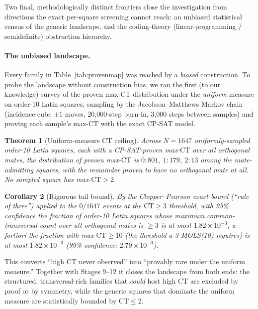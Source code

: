 \documentclass[11pt,a4paper]{article}
\newtheorem{theorem}{Theorem}[section]
\newtheorem{corollary}[theorem]{Corollary}
\theoremstyle{remark}
\newcommand{\CT}{\mathrm{CT}}
\begin{document}
Two final, methodologically distinct frontiers close the investigation
from directions the exact per-square screening cannot reach: an unbiased
statistical census of the generic landscape, and the coding-theory
(linear-programming / semidefinite) obstruction hierarchy.

\paragraph{The unbiased landscape.}
Every family in Table~\ref{tab:provenmap} was reached by a \emph{biased}
construction. To probe the landscape without construction bias, we ran the
first (to our knowledge) survey of the proven max-$\CT$ distribution under
the \emph{uniform} measure on order-10 Latin squares, sampling by the
Jacobson--Matthews Markov chain~\cite{jm1996} (incidence-cube $\pm1$ moves,
20{,}000-step burn-in, 3{,}000 steps between samples) and proving each
sample's max-$\CT$ with the exact CP-SAT model.

\begin{theorem}[Uniform-measure $\CT$ ceiling]\label{thm:survey}
Across $N = 1647$ uniformly-sampled order-10 Latin squares, each with a
CP-SAT-proven max-$\CT$ over all orthogonal mates, the distribution of
proven max-$\CT$ is $0\!:\!801,\ 1\!:\!179,\ 2\!:\!13$ among the
mate-admitting squares, with the remainder proven to have no orthogonal
mate at all. \emph{No sampled square has max-$\CT > 2$.}
\end{theorem}

\begin{corollary}[Rigorous tail bound]\label{cor:tailbound}
By the Clopper--Pearson exact bound (``rule of three'') applied to the
$0/1647$ events at the $\CT \geq 3$ threshold, with 95\% confidence the
fraction of order-10 Latin squares whose maximum common-transversal count
over all orthogonal mates is $\geq 3$ is at most $1.82\times10^{-3}$; a
fortiori the fraction with max-$\CT \geq 10$ (the threshold a 3-MOLS(10)
requires) is at most $1.82\times10^{-3}$ (99\% confidence:
$2.79\times10^{-3}$).
\end{corollary}

This converts ``high $\CT$ never observed'' into ``provably rare under the
uniform measure.'' Together with Stages 9--12 it closes the landscape from
both ends: the structured, transversal-rich families that \emph{could} host
high $\CT$ are excluded by proof or by symmetry, while the generic squares
that dominate the uniform measure are statistically bounded by $\CT\leq2$.
\end{document}
